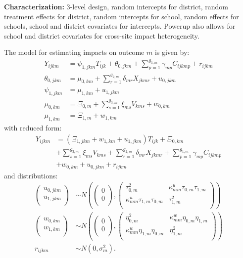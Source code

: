 \documentclass[12pt]{article}
\begin{document}
\textbf{Characterization:} 3-level design, random intercepts for district, random treatment effects for district, random intercepts for school, random effects for schools, school and district covariates for intercepts. Powerup also allows for school and district covariates for cross-site impact heterogeneity.

The model for estimating impacts on outcome $m$ is given by:
\begin{align}
Y_{ijkm} &= \psi_{1,jkm} T_{ijk} + \theta_{0,jkm} + \sum_{p=1}^{g_{1,m}} \gamma_{mp} C_{ijkmp} + r_{ijkm}\\
\nonumber \theta_{0,jkm} &= \mu_{0,km} + \sum_{r=1}^{g_{2,m}} \delta_{mr} X_{jkmr} + u_{0,jkm}\\
\nonumber \psi_{1,jkm} &= \mu_{1,km} + u_{1,jkm} \\
\nonumber \mu_{0,km}  &= \Xi_{0,m} + \sum_{s=1}^{g_{3,m}} \xi_{ms} V_{kms} + w_{0,km}\\
\nonumber \mu_{1,km}  &= \Xi_{1,m} + w_{1,km}
\end{align}
with reduced form:
\begin{align}
Y_{ijkm} &= \left(\Xi_{1,jkm} + w_{1,km} + u_{1,jkm}\right) T_{ijk} + \Xi_{0,km} \\
\nonumber & + \sum_{s=1}^{g_{3,m}} \xi_{ms} V_{kms} + \sum_{r=1}^{g_{2,m}} \delta_{mr} X_{jkmr} + \sum_{p=1}^{g_{1,m}} \gamma_{mp} C_{ijkmp}\\
 \nonumber &+ w_{0,km} + u_{0,jkm} + r_{ijkm}
\end{align}
and distributions:
\begin{align}
\begin{pmatrix} u_{0, jkm} \\ u_{1,jkm}\\ \end{pmatrix} &\sim
N\left(\begin{pmatrix} 0 \\ 0\\ \end{pmatrix}, \begin{pmatrix} \tau^2_{0,m} & \kappa^u_{mm} \tau_{0,m} \tau_{1,m} \\ \kappa^u_{mm} \tau_{1,m} \tau_{0,m} & \tau^2_{1,m} \\ \end{pmatrix}\right) \\
\nonumber \begin{pmatrix} w_{0, km} \\ w_{1,km}\\ \end{pmatrix} &\sim
N\left( \begin{pmatrix} 0 \\ 0\\ \end{pmatrix}, \begin{pmatrix} \eta^2_{0,m} & \kappa^w_{mm} \eta_{0,m} \eta_{1,m} \\ \kappa^w_{mm} \eta_{1,m} \eta_{0,m} & \eta^2_{1,m} \\ \end{pmatrix}\right) \\
\nonumber r_{ijkm} &\sim N\left(0, \sigma^2_m\right).
\end{align}
\end{document}
